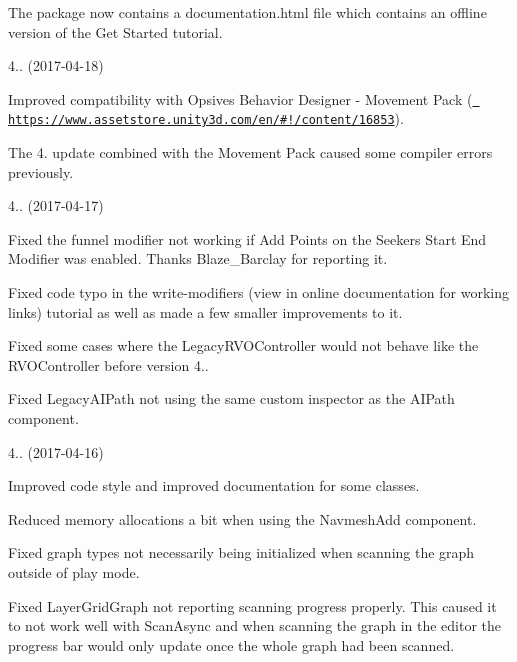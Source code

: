 \begin{DoxyItemize}
\begin{DoxyItemize}
\item The package now contains a \textquotesingle{}documentation.\+html\textquotesingle{} file which contains an offline version of the \textquotesingle{}Get Started\textquotesingle{} tutorial.
\end{DoxyItemize}
\item 4.. (2017-\/04-\/18)
\begin{DoxyItemize}
\item Improved compatibility with Opsive\textquotesingle{}s Behavior Designer -\/ Movement Pack (\href{https://www.assetstore.unity3d.com/en/\#!/content/16853}{\texttt{ https\+://www.\+assetstore.\+unity3d.\+com/en/\#!/content/16853}}).
\begin{DoxyItemize}
\item The 4. update combined with the Movement Pack caused some compiler errors previously.
\end{DoxyItemize}
\end{DoxyItemize}
\item 4.. (2017-\/04-\/17)
\begin{DoxyItemize}
\item Fixed the funnel modifier not working if \textquotesingle{}Add Points\textquotesingle{} on the Seeker\textquotesingle{}s Start End Modifier was enabled. Thanks Blaze\+\_\+\+Barclay for reporting it.
\item Fixed code typo in the write-\/modifiers (view in online documentation for working links) tutorial as well as made a few smaller improvements to it.
\item Fixed some cases where the Legacy\+R\+V\+O\+Controller would not behave like the R\+V\+O\+Controller before version 4..
\item Fixed Legacy\+A\+I\+Path not using the same custom inspector as the A\+I\+Path component.
\end{DoxyItemize}
\item 4.. (2017-\/04-\/16)
\begin{DoxyItemize}
\item Improved code style and improved documentation for some classes.
\item Reduced memory allocations a bit when using the Navmesh\+Add component.
\item Fixed graph types not necessarily being initialized when scanning the graph outside of play mode.
\item Fixed Layer\+Grid\+Graph not reporting scanning progress properly. This caused it to not work well with Scan\+Async and when scanning the graph in the editor the progress bar would only update once the whole graph had been scanned.

\end{DoxyItemize}
\end{DoxyItemize}
